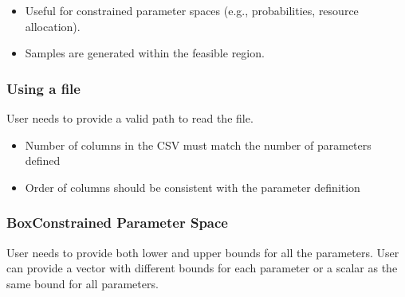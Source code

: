 \documentclass[letterpaper,10pt,english,openany,oneside]{sphinxmanual}
\begin{document}
\begin{itemize}
\begin{itemize}
\begin{itemize}
\item {} 
\sphinxAtStartPar
using matrix form: \(M x \leq 1\).

\end{itemize}

\item {} 
\sphinxAtStartPar
Useful for constrained parameter spaces (e.g., probabilities, resource allocation).

\item {} 
\sphinxAtStartPar
Samples are generated within the feasible region.

\end{itemize}

\end{itemize}


\subsubsection{Using a  file}
\label{\detokenize{user-guide/defining-parameter-space:using-a-csv-file}}
\sphinxAtStartPar
User needs to provide a valid path to read the  file.

\begin{sphinxVerbatim}[commandchars=\\\{\}]
\end{sphinxVerbatim}
\begin{itemize}
\item {} 
\sphinxAtStartPar
Number of columns in the CSV must match the number of parameters defined

\item {} 
\sphinxAtStartPar
Order of columns should be consistent with the parameter definition

\end{itemize}


\subsubsection{Box\sphinxhyphen{}Constrained Parameter Space}
\label{\detokenize{user-guide/defining-parameter-space:box-constrained-parameter-space}}
\sphinxAtStartPar
User needs to provide both lower and upper bounds for all the parameters. User can provide a vector with different bounds for each parameter or a scalar as the same bound for all parameters.
\end{document}
